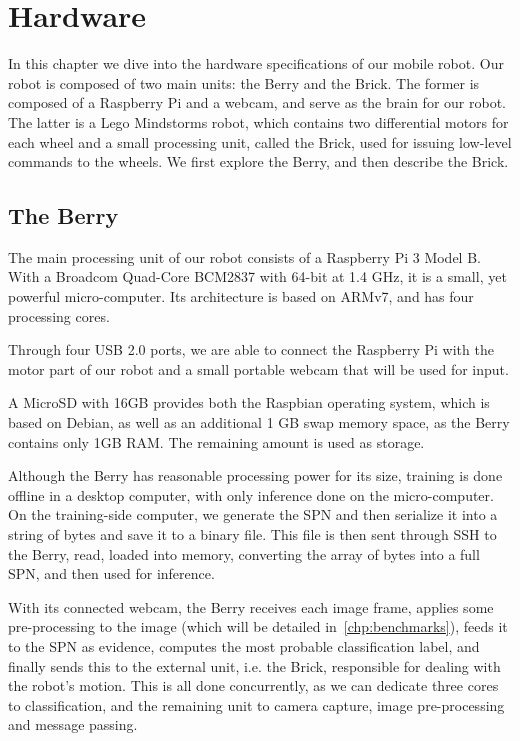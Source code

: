 
\chapter{Hardware}\label{chp:hardware}

In this chapter we dive into the hardware specifications of our mobile robot. Our robot is composed
of two main units: the Berry and the Brick. The former is composed of a Raspberry Pi and a webcam,
and serve as the brain for our robot. The latter is a Lego Mindstorms robot, which contains two
differential motors for each wheel and a small processing unit, called the Brick, used for issuing
low-level commands to the wheels. We first explore the Berry, and then describe the Brick.

\section{The Berry}

The main processing unit of our robot consists of a Raspberry Pi 3 Model B. With a Broadcom
Quad-Core BCM2837 with 64-bit at 1.4 GHz, it is a small, yet powerful micro-computer. Its
architecture is based on ARMv7, and has four processing cores.

Through four USB 2.0 ports, we are able to connect the Raspberry Pi with the motor part of our
robot and a small portable webcam that will be used for input.

A MicroSD with 16GB provides both the Raspbian operating system, which is based on Debian, as well
as an additional 1 GB swap memory space, as the Berry contains only 1GB RAM. The remaining amount
is used as storage.

Although the Berry has reasonable processing power for its size, training is done offline in a
desktop computer, with only inference done on the micro-computer. On the training-side computer, we
generate the SPN and then serialize it into a string of bytes and save it to a binary file. This
file is then sent through SSH to the Berry, read, loaded into memory, converting the array of bytes
into a full SPN, and then used for inference.

With its connected webcam, the Berry receives each image frame, applies some pre-processing to the
image (which will be detailed in~\autoref{chp:benchmarks}), feeds it to the SPN as evidence,
computes the most probable classification label, and finally sends this to the external unit, i.e.
the Brick, responsible for dealing with the robot's motion. This is all done concurrently, as we
can dedicate three cores to classification, and the remaining unit to camera capture, image
pre-processing and message passing.

